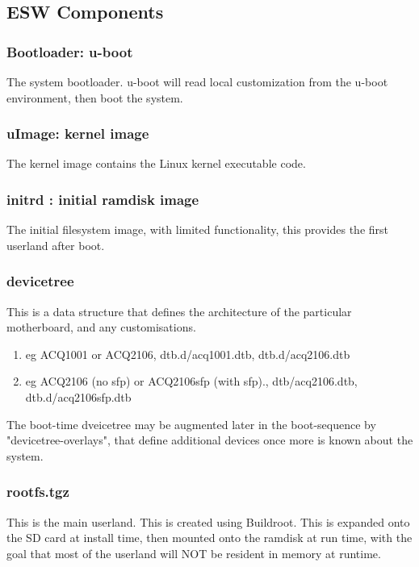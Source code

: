 \documentclass[]{article}
\begin{document}
\subsection{ESW Components}

\subsubsection{Bootloader: u-boot}
The system bootloader. u-boot will read local customization from the u-boot environment, then boot the system.

\subsubsection{uImage: kernel image}
The kernel image contains the Linux kernel executable code.

\subsubsection{initrd : initial ramdisk image}
The initial filesystem image, with limited functionality, this provides the first userland after boot.

\subsubsection{devicetree}
This is a data structure that defines the architecture of the particular motherboard, and any customisations.
\begin{enumerate}
    \item eg ACQ1001 or ACQ2106, dtb.d/acq1001.dtb, dtb.d/acq2106.dtb
    \item eg ACQ2106 (no sfp) or ACQ2106sfp (with sfp)., dtb/acq2106.dtb, dtb.d/acq2106sfp.dtb
\end{enumerate}
The boot-time dveicetree may be augmented later in the boot-sequence by "devicetree-overlays", that define additional devices once more is known about the system.

\subsubsection{rootfs.tgz}
This is the main userland. This is created using Buildroot. This is expanded onto the SD card at install time, then mounted onto the ramdisk at run time, with the goal that most of the userland will NOT be resident in memory at runtime.
\end{document}
